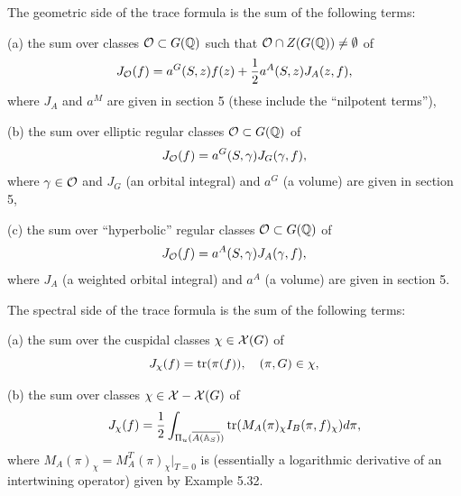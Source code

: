 The geometric side of the trace formula is the sum of the following terms:

(a) the sum over classes ${\cal{O}}\subset G(\mathbb{Q} )$
such that ${\cal{O}}\cap Z(G(\mathbb{Q} ))\not= \emptyset$ of
\begin{equation}
J_{\cal{O}}(f)=
a^G(S,z)f(z)+{1\over 2}a^A(S,z)J_A(z,f),
\end{equation}
where $J_A$ and $a^M$ are given in section 5 (these include the
``nilpotent terms''),

(b) the sum over elliptic regular classes ${\cal{O}}\subset G(\mathbb{Q} )$
of
\begin{equation}
J_{\cal{O}}(f)=
a^G(S,\gamma)J_G(\gamma,f),
\end{equation}
where $\gamma\in {\cal{O}}$ and
$J_G$ (an orbital integral) and $a^G$ (a volume)
are given in section 5,

(c) the sum over ``hyperbolic'' regular classes
${\cal{O}}\subset G(\mathbb{Q} )$
of
\begin{equation}
J_{\cal{O}}(f)=
a^A(S,\gamma)J_A(\gamma,f),
\end{equation}
where $J_A$ (a weighted orbital integral) and $a^A$ (a volume)
are given in section 5.

The spectral side of the trace formula is the sum of the following terms:

(a) the sum over the cuspidal classes $\chi\in {\cal{X}}(G)$ of
\begin{equation}
J_\chi(f)=
{\rm tr}(\pi(f)),\ \ \ (\pi,G)\in\chi,
\end{equation}

(b) the sum over classes $\chi\in {\cal{X}}-{\cal{X}}(G)$ of
\begin{equation}
J_\chi(f)=
{1\over 2}\int_{\Pi_u(\overline{A(\mathbb{A} _S)})}
{\rm tr}(M_A(\pi)_\chi I_B(\pi,f)_\chi)d\pi,
\end{equation}
where $M_A(\pi)_\chi =M_A^T(\pi)_\chi|_{T=0}$ is
(essentially a logarithmic derivative of an intertwining operator)
given by Example 5.32.



